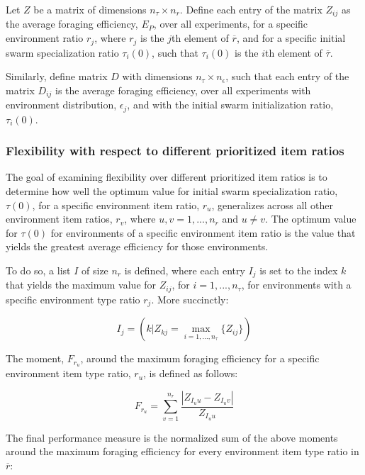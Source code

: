 Let $Z$ be a matrix of dimensions $n_{\tau} \times n_r$. Define each entry of the matrix $Z_{ij}$ as the average foraging efficiency, $E_P$, over all experiments, for a specific environment ratio $r_j$, where $r_j$ is the $j$th element of $\overline{r}$, and for a specific initial swarm specialization ratio $\tau_i(0)$, such that $\tau_i(0)$ is the $i$th element of $\overline{\tau}$.

Similarly, define matrix $D$ with dimensions $n_\tau \times n_\epsilon$, such that each entry of the matrix $D_{ij}$ is the average foraging efficiency, over all experiments with environment distribution, $\epsilon_j$, and with the initial swarm initialization ratio, $\tau_i(0)$.


\subsubsection{Flexibility with respect to different prioritized item ratios}
\label{setup:flexibility:prioritizeditemratio}

The goal of examining flexibility over different prioritized item ratios is to determine how well the optimum value for initial swarm specialization ratio, $\tau(0)$, for a specific environment item ratio, $r_u$, generalizes across all other environment item ratios, $r_v$, where $u,v = 1,...,n_r$ and $u \neq v$. The optimum value for $\tau(0)$ for environments of a specific environment item ratio is the value that yields the greatest average efficiency for those environments.

To do so, a list $I$ of size $n_r$ is defined, where each entry $I_j$ is set to the index $k$ that yields the maximum value for $Z_{ij}$, for $i = 1,..., n_\tau$, for environments with a specific environment type ratio $r_j$. More succinctly:

\begin{equation}
I_j = ( k | Z_{kj} = \max_{i=1,...,n_\tau}\{Z_{ij}\} )
\end{equation}

The moment, $F_{r_u}$, around the maximum foraging efficiency for a specific environment item type ratio, $r_u$, is defined as follows: 

\begin{equation}
F_{r_u} = \sum_{v=1}^{n_r}\dfrac{|Z_{I_uu}- Z_{I_uv}|}{Z_{I_uu}}
\end{equation}

The final performance measure is the normalized sum of the above moments around the maximum foraging efficiency for every environment item type ratio in $\overline{r}$:

